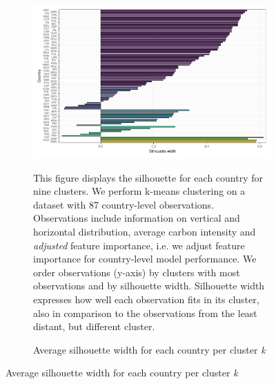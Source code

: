  \begin{figure}[ht!]\ContinuedFloat
   \centering
   \begin{subfigure}[b]{\textwidth}
   \centering
    \caption{Average silhouette width for each country per cluster \textit{k}} \label{fig:G4_silhouette_2}
   \includegraphics{Figures_Appendix/Figure_Silhouette_Clusters_2}
   \begin{subcaption2}
     This figure displays the silhouette for each country for nine clusters. We perform k-means clustering on a dataset with 87 country-level observations. Observations include information on vertical and horizontal distribution, average carbon intensity and \textit{adjusted} feature importance, i.e. we adjust feature importance for country-level model performance. We order observations (y-axis) by clusters with most observations and by silhouette width. Silhouette width expresses how well each observation fits in its cluster, also in comparison to the observations from the least distant, but different cluster.
   \end{subcaption2}
   \end{subfigure}
 \end{figure}
 \clearpage

